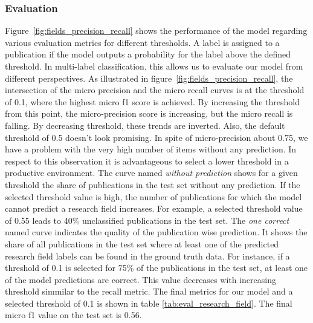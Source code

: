 \subsubsection{Evaluation}
Figure~\ref{fig:fields_precision_recall} shows the performance of the model regarding various evaluation metrics for different thresholds.
A label is assigned to a publication if the model outputs a probability for the label above the defined threshold.
In multi-label classification, this allows us to evaluate our model from different perspectives. 
As illustrated in figure~\ref{fig:fields_precision_recall}, the intersection of the micro precision and the micro recall curves is at the threshold of 0.1, where the highest micro f1 score is achieved.
By increasing the threshold from this point, the micro-precision score is increasing, but the micro recall is falling.
By decreasing threshold, these trends are inverted.
Also, the default threshold of 0.5 doesn't look promising.
In spite of micro-precision about 0.75, we have a problem with the very high number of items without any prediction. 
In respect to this observation it is advantageous to select a lower threshold in a productive environment.
The curve named \emph{without prediction} shows for a given threshold the share of publications in the test set without any prediction.
If the selected threshold value is high, the number of publications for which the model cannot predict a research field increases.
For example, a selected threshold value of 0.55 leads to 40\% unclassified publications in the test set.
The \emph{one correct} named curve indicates the quality of the publication wise prediction.
It shows the share of all publications in the test set where at least one of the predicted research field labels can be found in the ground truth data.
For instance, if a threshold of 0.1 is selected for 75\% of the publications in the test set, at least one of the model predictions are correct.
This value decreases with increasing threshold simmilar to the recall metric.
The final metrics for our model and a selected threshold of 0.1 is shown in table \ref{tab:eval_research_field}.
The final micro f1 value on the test set is 0.56.





